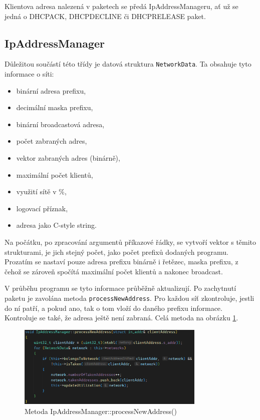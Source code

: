 \documentclass[a4paper, 11pt, hidelinks]{article}
\begin{document}
Klientova adresa nalezená v paketech se předá IpAddressManageru, ať už se jedná o DHCPACK, DHCPDECLINE či DHCPRELEASE paket.
\subsection{IpAddressManager}\label{3_4_ipam}
Důležitou součástí této třídy je datová struktura \texttt{NetworkData}.
Ta obsahuje tyto informace o síti:
\begin{itemize}
    \item binární adresa prefixu,
    \item decimální maska prefixu,
    \item binární broadcastová adresa,
    \item počet zabraných adres,
    \item vektor zabraných adres (binárně),
    \item maximální počet klientů,
    \item využití sítě v \%,
    \item logovací příznak,
    \item adresa jako C-style string. 
\end{itemize}
Na počátku, po zpracování argumentů příkazové řádky, se vytvoří vektor s těmito strukturami, je jich stejný počet, jako počet prefixů dodaných programu.
Prozatím se nastaví pouze adresa prefixu binárně i řetězec, maska prefixu, z čehož se zároveň spočítá maximální počet klientů a nakonec broadcast.

V průběhu programu se tyto informace průběžně aktualizují.
Po zachytnutí paketu je zavolána metoda \texttt{processNewAddress}.
Pro každou síť zkontroluje, jestli do ní patří, a pokud ano, tak o tom vloží do daného prefixu informace. 
Kontroluje se také, že adresa ještě není zabraná.
Celá metoda na obrázku \ref{pic:processNewAddress}.
\begin{figure}[t]
    \centering
    \includegraphics[width=0.8\textwidth]{img/processNewAddress.png}
    \caption{Metoda IpAddressManager::processNewAddress()}
    \label{pic:processNewAddress}
\end{figure}
\end{document}

